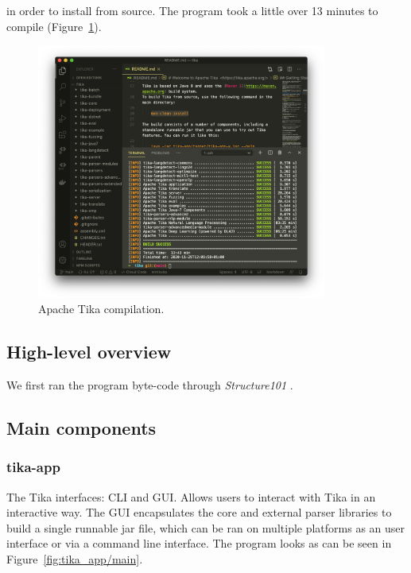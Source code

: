 \documentclass{article}
\begin{document}
in order to install from source. The program took a little over 13 minutes to compile (Figure~\ref{fig:compilation}).

\begin{figure}[ht]
    \centering
    \includegraphics[width=0.85\textwidth]{report/images/compiling-tika.png}
    \caption{Apache Tika compilation.}
    \label{fig:compilation}
\end{figure}

\subsection{High-level overview}
We first ran the program byte-code through \textit{Structure101} \citep{mcnamara_hickey_oreilly_chedgey_2018}.

\subsection{Main components}
\subsubsection{tika-app}
The Tika interfaces: CLI and GUI. Allows users to interact with Tika in an interactive way. The GUI encapsulates the core and external parser libraries to build a single runnable jar file, which can be ran on multiple platforms as an user interface or via a command line interface. The program looks as can be seen in Figure~\ref{fig:tika_app/main}.
\end{document}
